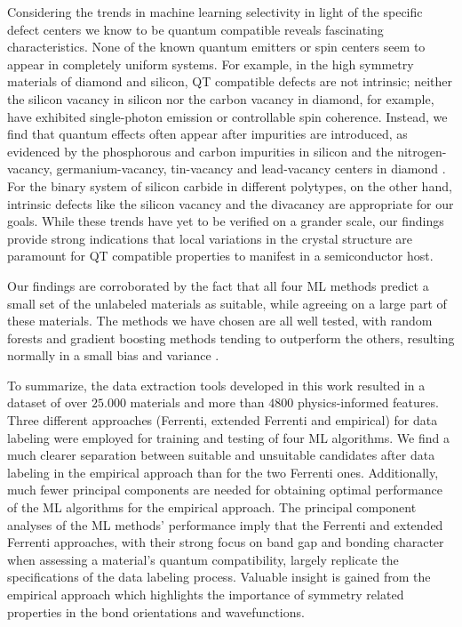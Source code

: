 \documentclass[superscriptaddress,unsortedaddress,
 amsmath,amssymb,
 aps,
]{revtex4-2}
\begin{document}
Considering the trends in machine learning selectivity in light of the specific defect centers we know to be quantum compatible reveals fascinating characteristics. None of the known quantum emitters or spin centers seem to appear in completely uniform systems. For example, in the high symmetry materials of diamond and silicon, QT compatible defects are not intrinsic; neither the silicon vacancy in silicon nor the carbon vacancy in diamond, for example,  have exhibited single-photon emission or controllable spin coherence. Instead, we find that quantum effects often appear after impurities are introduced, as evidenced by the phosphorous and carbon impurities in silicon \cite{He2019,Redjem2020} and the nitrogen-vacancy, germanium-vacancy, tin-vacancy and lead-vacancy centers in diamond \cite{Thiering2020}. 
For the binary system of silicon carbide in different polytypes, on the other hand, intrinsic defects like the silicon vacancy and the divacancy are appropriate for our goals. 
While these trends have yet to be verified on a grander scale, our findings provide strong indications that local variations in the crystal structure are paramount for QT compatible properties to manifest in a semiconductor host. 

Our findings are corroborated by the fact that all four ML methods predict a small set of the unlabeled materials as suitable, while agreeing on a large part of these materials. 
The methods we have chosen are all well tested, with random forests and gradient boosting methods tending to outperform the others, resulting normally in a small bias and variance \cite{Hastie2009,Mehta2019,Murphy2012}. 

To summarize, the data extraction tools developed in this work resulted in a dataset of over $25.000$ materials and more than $4800$ physics-informed features. Three different approaches (Ferrenti, extended Ferrenti and empirical) for data labeling were employed for training and testing of four ML algorithms. 
We find a much clearer separation between suitable and unsuitable candidates after data labeling in the empirical approach than for the two Ferrenti ones. 
Additionally, much fewer principal components are needed for obtaining optimal performance of the ML algorithms for the empirical approach. 
The principal component analyses of the ML methods' performance imply that the Ferrenti and extended Ferrenti approaches, with their strong focus on band gap and bonding character when assessing a material's quantum compatibility, largely replicate the specifications of the data labeling process. 
Valuable insight is gained from the empirical approach which highlights the importance of symmetry related properties in the bond orientations and wavefunctions. 
\end{document}
